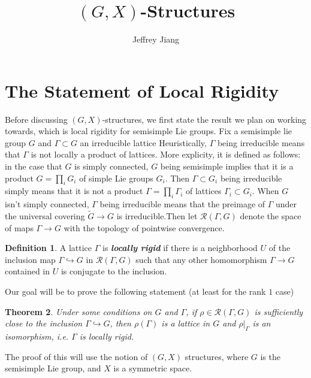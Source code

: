 \documentclass[psamsfonts, 12pt]{amsart}
\newtheorem{thm}{Theorem}[section]
\theoremstyle{definition}
\newtheorem{defn}[thm]{Definition}
\theoremstyle{remark}
\newcommand{\ib}[1]{\textbf{\textit{#1}}}
\begin{document}
%
\author{Jeffrey Jiang}
%
\title{$(G,X)$-Structures}
%
\maketitle
%
\section{The Statement of Local Rigidity}
%
Before discussing $(G,X)$-structures, we first state the result we plan on
working towards, which is local rigidity for semisimple Lie groups. Fix a
semisimple lie group $G$ and $\Gamma \subset G$ an irreducible lattice
Heuristically, $\Gamma$ being irreducible means that $\Gamma$ is not locally a product
of lattices. More explicity, it is defined as follows: in the case that $G$ is
simply connected, $G$ being semisimple implies that it is a product
$G = \prod_i G_i$ of simple Lie groups $G_i$. Then $\Gamma \subset G_i$ being
irreducible simply means that it is not a product $\Gamma = \prod_i\Gamma_i$ of
lattices $\Gamma_i \subset G_i$. When $G$ isn't simply connected, $\Gamma$ being
irreducible means that the preimage of $\Gamma$ under the universal covering
$\widetilde{G} \to G$ is irreducible.Then let $\mathcal{R}(\Gamma,G)$ denote the
space of maps $\Gamma \to G$ with the topology of pointwise convergence.
%
\begin{defn}
A lattice $\Gamma$ is \ib{locally rigid} if there is a neighborhood $U$ of
the inclusion map $\Gamma \hookrightarrow G$ in $\mathcal{R}(\Gamma,G)$
such that any other homomorphism $\Gamma \to G$ contained in $U$ is conjugate
to the inclusion.
\end{defn}
%
Our goal will be to prove the following statement (at least for the rank $1$ case)
%
\begin{thm}
Under some conditions on $G$ and $\Gamma$, if $\rho \in \mathcal{R}(\Gamma,G)$ is
sufficiently close to the inclusion $\Gamma \hookrightarrow G$, then
$\rho(\Gamma)$ is a lattice in $G$ and $\rho\vert_\Gamma$ is an isomorphism, i.e.
$\Gamma$ is locally rigid.
\end{thm}
%
The proof of this will use the notion of $(G,X)$ structures, where $G$ is
the semisimple Lie group, and $X$ is a symmetric space.
%
\end{document}
